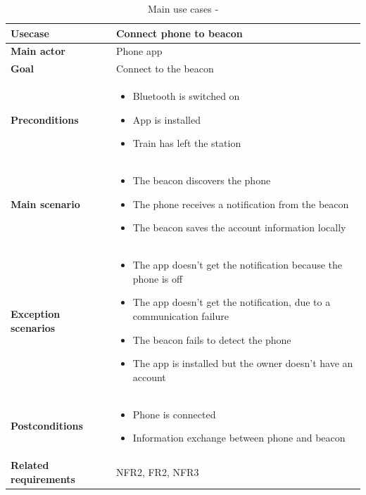 \begin{table}[H]
	\centering
	\begin{tabularx}{\linewidth}{l|X}
		\textbf{Usecase}      & Connect phone to beacon \\ \hline
		\textbf{Main actor}  & Phone app \\ \hline
		\textbf{Goal}   & Connect to the beacon \\ \hline
		\textbf{Preconditions}     & \begin{itemize}
			\item Bluetooth is switched on
			\item App is installed
			\item Train has left the station
		\end{itemize} \\ \hline
		\textbf{Main scenario}    & \begin{itemize}
			\item The beacon discovers the phone
			\item The phone receives a notification from the beacon
			\item The beacon saves the account information locally
		\end{itemize} \\ \hline
		\textbf{Exception scenarios} & 
		\begin{itemize}
			\item The app doesn’t get the notification because
			the phone is off
			\item The app doesn’t get the notification, due to a
			communication failure 
			\item The beacon fails to detect the phone
			\item The app is installed but the owner doesn't have an account
		\end{itemize}
		\\ \hline
		\textbf{Postconditions} & 
		\begin{itemize}
			\item Phone is connected
			\item Information exchange between phone and beacon
		\end{itemize}
		
		\\ \hline
		\textbf{Related requirements} & NFR2, FR2, NFR3\\ \hline
	\end{tabularx}
	\caption{Main use cases - }
	\label{tbl:uc1}
\end{table}

